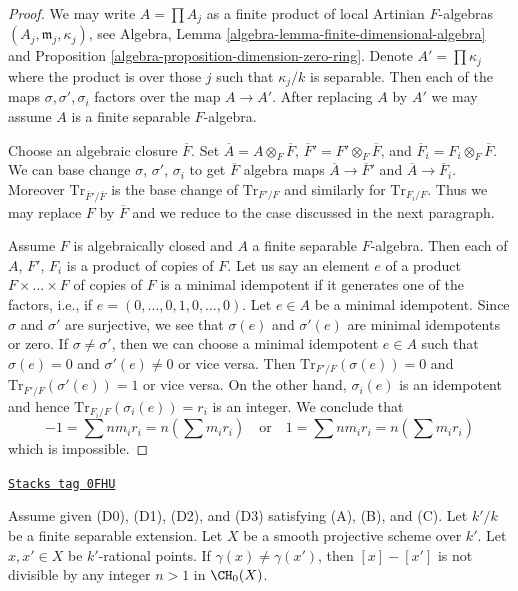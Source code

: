 \begin{proof}
We may write $A = \prod A_j$ as a finite product of
local Artinian $F$-algebras $(A_j, \mathfrak m_j, \kappa_j)$, see
Algebra, Lemma \ref{algebra-lemma-finite-dimensional-algebra} and
Proposition \ref{algebra-proposition-dimension-zero-ring}.
Denote $A' = \prod \kappa_j$ where the product is over those $j$
such that $\kappa_j/k$ is separable. Then each of the maps
$\sigma, \sigma', \sigma_i$ factors over the map
$A \to A'$. After replacing $A$ by $A'$ we may assume
$A$ is a finite separable $F$-algebra.

\medskip\noindent
Choose an algebraic closure $\overline{F}$. Set
$\overline{A} = A \otimes_F \overline{F}$,
$\overline{F}' = F' \otimes_F \overline{F}$, and
$\overline{F}_i = F_i \otimes_F \overline{F}$.
We can base change $\sigma$, $\sigma'$, $\sigma_i$
to get $\overline{F}$ algebra maps $\overline{A} \to \overline{F}'$
and $\overline{A} \to \overline{F}_i$. Moreover
$\text{Tr}_{\overline{F}'/\overline{F}}$ is the base
change of $\text{Tr}_{F'/F}$ and similarly for
$\text{Tr}_{F_i/F}$. Thus we may replace
$F$ by $\overline{F}$ and we reduce to the case discussed in
the next paragraph.

\medskip\noindent
Assume $F$ is algebraically closed and $A$ a finite separable $F$-algebra.
Then each of $A$, $F'$, $F_i$ is a product of copies of $F$.
Let us say an element $e$ of a product
$F \times \ldots \times F$ of copies of $F$ is a minimal idempotent
if it generates one of the factors, i.e., if
$e = (0, \ldots, 0, 1, 0, \ldots, 0)$. Let $e \in A$ be a minimal idempotent.
Since $\sigma$ and $\sigma'$
are surjective, we see that $\sigma(e)$ and $\sigma'(e)$ are minimal
idempotents or zero. If $\sigma \not = \sigma'$, then we can choose
a minimal idempotent $e \in A$ such that $\sigma(e) = 0$ and
$\sigma'(e) \not = 0$ or vice versa. Then
$\text{Tr}_{F'/F}(\sigma(e)) = 0$ and
$\text{Tr}_{F'/F}(\sigma'(e)) = 1$ or vice versa.
On the other hand, $\sigma_i(e)$ is an idempotent
and hence $\text{Tr}_{F_i/F}(\sigma_i(e)) = r_i$ is an integer.
We conclude that
$$
-1 = \sum n m_i r_i = n (\sum m_i r_i)
\quad\text{or}\quad
1 = \sum n m_i r_i = n (\sum m_i r_i)
$$
which is impossible.
\end{proof}

\begin{lemma}
\label{weil-lemma-relations-classes-points}
\href{https://stacks.math.columbia.edu/tag/0FHU}{\texttt{Stacks tag 0FHU}}

Assume given (D0), (D1), (D2), and (D3) satisfying (A), (B), and (C).
Let $k'/k$ be a finite separable extension.
Let $X$ be a smooth projective scheme over $k'$.
Let $x, x' \in X$ be $k'$-rational points.
If $\gamma(x) \not = \gamma(x')$, then
$[x] - [x']$ is not divisible by any integer $n > 1$ in $\CH_0(X)$.
\end{lemma}

